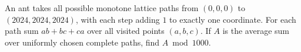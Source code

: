 An ant takes all possible monotone lattice paths from $(0,0,0)$ to $(2024,2024,2024)$, with each step adding $1$ to exactly one coordinate. For each path sum $ab+bc+ca$ over all visited points $(a,b,c)$. If $A$ is the average sum over uniformly chosen complete paths, find $A\bmod1000$.
